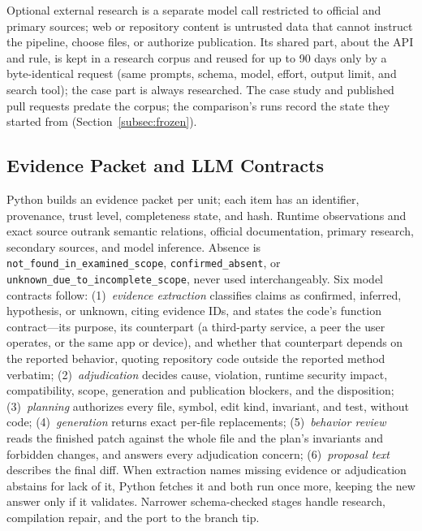 \documentclass[conference]{IEEEtran}
\begin{document}
Optional external research is a separate model call restricted to official and
primary sources; web or repository content is untrusted data that cannot
instruct the pipeline, choose files, or authorize publication. Its shared part,
about the API and rule, is kept in a research corpus and reused for up to 90
days only by a byte-identical request (same prompts, schema, model, effort,
output limit, and search tool); the case part is always researched. The case
study and published pull requests predate the corpus; the comparison's runs
record the state they started from (Section~\ref{subsec:frozen}).

\subsection{Evidence Packet and LLM Contracts}

Python builds an evidence packet per unit; each item has an identifier,
provenance, trust level, completeness state, and hash. Runtime observations and
exact source outrank semantic relations, official documentation, primary
research, secondary sources, and model inference. Absence is
\texttt{not\_found\_in\_examined\_scope}, \texttt{confirmed\_absent}, or
\texttt{unknown\_due\_to\_}\allowbreak\texttt{incomplete\_scope}, never used
interchangeably. Six model contracts follow:
(1)~\emph{evidence extraction} classifies claims as confirmed, inferred,
hypothesis, or unknown, citing evidence IDs, and states the code's function
contract---its purpose, its counterpart (a third-party service, a peer the user
operates, or the same app or device), and whether that counterpart depends on
the reported behavior, quoting repository code outside the reported method
verbatim; (2)~\emph{adjudication} decides cause, violation, runtime security
impact, compatibility, scope, generation and publication blockers, and the
disposition; (3)~\emph{planning} authorizes every file, symbol, edit kind,
invariant, and test, without code; (4)~\emph{generation} returns exact
per-file replacements; (5)~\emph{behavior review} reads the finished patch
against the whole file and the plan's invariants and forbidden changes, and
answers every adjudication concern; (6)~\emph{proposal text} describes the
final diff. When extraction names missing evidence or adjudication abstains for
lack of it, Python fetches it and both run once more, keeping the new answer
only if it validates. Narrower schema-checked stages handle research,
compilation repair, and the port to the branch tip.
\end{document}
